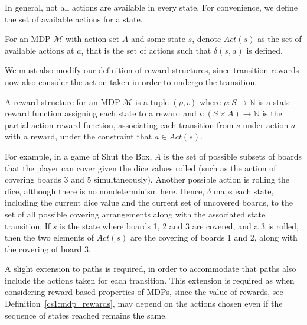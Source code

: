 In general, not all actions are available in every state. For convenience, we define the set of available actions for a state.

\begin{definition}
\label{cs1:available_actions}

For an MDP $\mathcal{M}$ with action set $A$ and some state $s$, denote $Act(s)$ as the set of available actions at $a$, that is the set of actions such that $\delta(s, a)$ is defined.

\end{definition}

We must also modify our definition of reward structures, since transition rewards now also consider the action taken in order to undergo the transition.

\begin{definition}
\label{cs1:mdp_rewards}

A reward structure for an MDP $\mathcal{M}$ is a tuple $(\rho, \iota)$ where $\rho : S \rightarrow \mathbb{N}$ is a state reward function assigning each state to a reward and $\iota : (S {\times} A) \rightarrow \mathbb{N}$ is the partial action reward function, associating each transition from $s$ under action $a$ with a reward, under the constraint that $a \in Act(s)$.
\end{definition}

For example, in a game of Shut the Box, $A$ is the set of possible subsets of boards that the player can cover given the dice values rolled (such as the action of covering boards 3 and 5 simultaneously). Another possible action is rolling the dice, although there is no nondeterminism here. Hence, $\delta$ maps each state, including the current dice value and the current set of uncovered boards, to the set of all possible covering arrangements along with the associated state transition. If $s$ is the state where boards 1, 2 and 3 are covered, and a 3 is rolled, then the two elements of $Act(s)$ are the covering of boards 1 and 2, along with the covering of board 3.

A slight extension to paths is required, in order to accommodate that paths also include the actions taken for each transition.  This extension is required as when considering reward-based properties of MDPs, since the value of rewards, see Definition~\ref{cs1:mdp_rewards}, may depend on the actions chosen even if the sequence of states reached remains the same. %

